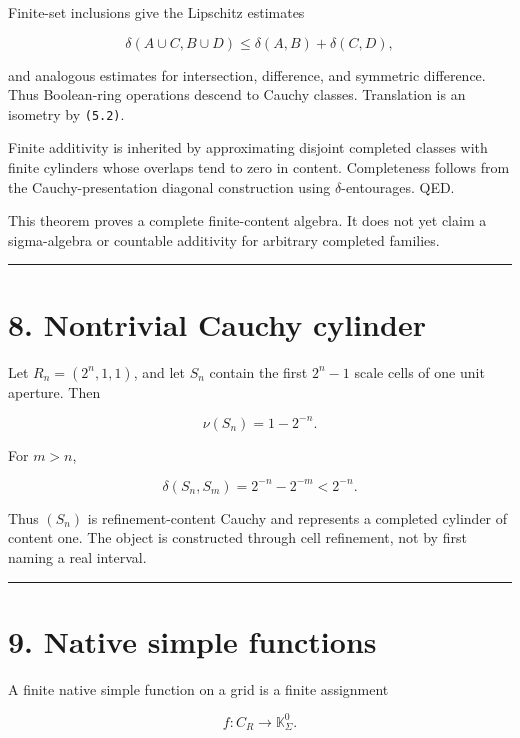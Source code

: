 Finite-set inclusions give the Lipschitz estimates

\[
\delta(A\cup C,B\cup D)
\le
\delta(A,B)+\delta(C,D),
\tag{7.6}
\]

and analogous estimates for intersection, difference, and symmetric difference.
Thus Boolean-ring operations descend to Cauchy classes. Translation is an
isometry by \texttt{(5.2)}.

Finite additivity is inherited by approximating disjoint completed classes with
finite cylinders whose overlaps tend to zero in content. Completeness follows
from the Cauchy-presentation diagonal construction using \(\delta\)-entourages.
QED.

This theorem proves a complete finite-content algebra. It does not yet claim a
sigma-algebra or countable additivity for arbitrary completed families.

\begin{center}\rule{0.5\linewidth}{0.5pt}\end{center}

\hypertarget{nontrivial-cauchy-cylinder}{%
\section{8. Nontrivial Cauchy cylinder}\label{nontrivial-cauchy-cylinder}}

Let \(R_n=(2^n,1,1)\), and let \(S_n\) contain the first
\(2^n-1\) scale cells of one unit aperture. Then

\[
\nu(S_n)=1-2^{-n}.
\tag{8.1}
\]

For \(m>n\),

\[
\delta(S_n,S_m)
=2^{-n}-2^{-m}
<2^{-n}.
\tag{8.2}
\]

Thus \((S_n)\) is refinement-content Cauchy and represents a completed cylinder
of content one. The object is constructed through cell refinement, not by first
naming a real interval.

\begin{center}\rule{0.5\linewidth}{0.5pt}\end{center}

\hypertarget{native-simple-functions}{%
\section{9. Native simple functions}\label{native-simple-functions}}

A finite native simple function on a grid is a finite assignment

\[
f:C_R\to\mathbb K_\Sigma^0.
\tag{9.1}
\]

